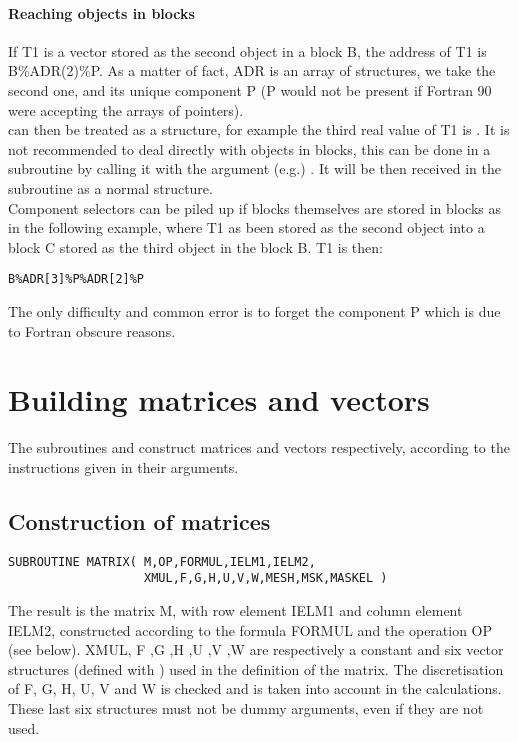 \paragraph{Reaching objects in blocks}

If T1 is a vector stored as the second object in a block B, the address of T1
is B\%ADR(2)\%P. As a matter of fact, ADR is an array of
 structures, we take the second one, and its unique
component P (P would not be present if Fortran 90 were accepting the arrays of
pointers).
\\
 can then be treated as a  structure,
  for example the third real value of T1 is . It is
    not recommended to deal directly with objects in blocks, this can be done
    in a subroutine by calling it with the argument (e.g.)
    . It will be then received in the subroutine as a
      normal  structure.
\\
Component selectors can be piled up if blocks themselves are stored in blocks
as in the following example, where T1 as been stored as the second object into
a block C stored as the third object in the block B. T1 is then:

\begin{lstlisting}[language=TelFortran]
B%ADR[3]%P%ADR[2]%P
\end{lstlisting}
The only difficulty and common error is to forget the component P which is due
to Fortran obscure reasons.

\section{Building matrices and vectors}

The subroutines  and  construct matrices and
vectors respectively, according to the instructions given in their arguments.

\subsection{Construction of matrices}

\begin{lstlisting}[language=TelFortran]
SUBROUTINE MATRIX( M,OP,FORMUL,IELM1,IELM2,
                   XMUL,F,G,H,U,V,W,MESH,MSK,MASKEL )
\end{lstlisting}
The result is the matrix M, with row element IELM1 and column element IELM2,
constructed according to the formula FORMUL and the operation OP (see below).
XMUL, F ,G ,H ,U ,V ,W are respectively a constant and six vector structures
(defined with ) used in the definition of the matrix. The
discretisation of F, G, H, U, V and W is checked and is taken into account in
the calculations. These last six structures must not be dummy arguments, even
if they are not used.

